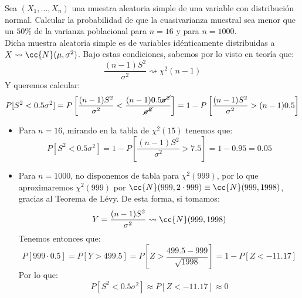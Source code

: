 \begin{ejercicio}
    Sea $(X_1, \ldots, X_n)$ una muestra aleatoria simple de una variable con distribución normal.  Calcular la probabilidad de que la cuasivarianza muestral sea menor que un $50\%$ de la varianza poblacional para $n = 16$ y para $n = 1000$.\\

    \noindent
    Dicha muestra aleatoria simple es de variables idénticamente distribuidas a $X\rightsquigarrow\cc{N}(\mu, \sigma^2)$. Bajo estas condiciones, sabemos por lo visto en teoría que:
    \begin{equation*}
        \dfrac{(n-1)S^2}{\sigma^2} \rightsquigarrow\chi^2(n-1)
    \end{equation*}
    Y queremos calcular:
    \begin{align*}
        P[S^2 < 0.5\sigma^2] = P\left[\dfrac{(n-1)S^2}{\sigma^2} < \dfrac{(n-1)0.5\cancel{\sigma^2}}{\cancel{\sigma^2}}\right] = 1-P\left[\dfrac{(n-1)S^2}{\sigma^2} > (n-1)0.5\right]
    \end{align*}
    \begin{itemize}
        \item Para $n=16$, mirando en la tabla de $\chi^2(15)$ tenemos que:
            \begin{equation*}
                P[S^2 < 0.5\sigma^2] = 1-P\left[\dfrac{(n-1)S^2}{\sigma^2} > 7.5\right] = 1-0.95 = 0.05
            \end{equation*}
        \item Para $n=1000$, no disponemos de tabla para $\chi^2(999)$, por lo que aproximaremos $\chi^2(999)$ por $\cc{N}(999, 2\cdot 999)\equiv \cc{N}(999, 1998)$, gracias al Teorema de Lévy. De esta forma, si tomamos:
            \begin{equation*}
                Y = \dfrac{(n-1)S^2}{\sigma^2}\rightsquigarrow\cc{N}(999, 1998)
            \end{equation*}
            Tenemos entonces que:
            \begin{equation*}
                P[999\cdot 0.5] = P[Y>499.5] = P\left[Z>\dfrac{499.5-999}{\sqrt{1998}}\right] = 1-P[Z< -11.17]
            \end{equation*}
            Por lo que:
            \begin{equation*}
                P[S^2 < 0.5\sigma^2] \approx P[Z< -11.17] \approx 0
            \end{equation*}
    \end{itemize}
\end{ejercicio}

